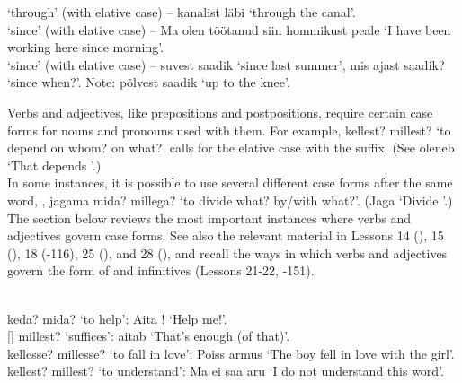  `through' (with elative case) -- kanalist läbi `through the canal'. \\

 `since' (with elative case) -- Ma olen töötanud siin hommikust peale `I have been working here since morning'. \\

 `since' (with elative case) -- suvest saadik `since last summer', mis ajast saadik? `since when?'. Note: põlvest saadik `up to the knee'.


\newSection \label{section-403} Verbs and adjectives, like prepositions and postpositions, require certain case forms for nouns and pronouns used with them. For example,  kellest? millest? `to depend on whom? on what?' calls for the elative case with the  suffix. (See oleneb  `That depends '.) \\

In some instances, it is possible to use several different case forms after the same word, \eg, jagama mida? millega? `to divide what? by/with what?'. (Jaga  `Divide '.) \\

The section below reviews the most important instances where verbs and adjectives govern case forms. See also the relevant material in Lessons 14 (), 15 (), 18 (-116), 25 (), and 28 (), and recall the ways in which verbs and adjectives govern the form of  and  infinitives (Lessons 21-22, -151).

\newSection \label{section-404}  \\

 keda? mida? `to help': Aita ! `Help me!'. \\

 {\small []} millest? `suffices':  aitab `That's enough (of that)'. \\

 kellesse? millesse? `to fall in love': Poiss armus  `The boy fell in love with the girl'. \\

 kellest? millest? `to understand': Ma ei saa  aru `I do not understand this word'. \\

